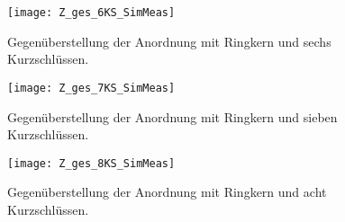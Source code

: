 \begin{figure}[htb]
	\centering
	\texttt{[image: Z\_ges\_6KS\_SimMeas]}
	\caption{Gegen\"uberstellung der Anordnung mit Ringkern und sechs Kurzschl\"ussen.}
	\label{fig:boxpolycrossrk6ksappend}
\end{figure}

\begin{figure}[htb]
	\centering
	\texttt{[image: Z\_ges\_7KS\_SimMeas]}
	\caption{Gegen\"uberstellung der Anordnung mit Ringkern und sieben Kurzschl\"ussen.}
	\label{fig:boxpolycrossrk7ksappend}
\end{figure}

\begin{figure}[htb]
	\centering
	\texttt{[image: Z\_ges\_8KS\_SimMeas]}
	\caption{Gegen\"uberstellung der Anordnung mit Ringkern und acht Kurzschl\"ussen.}
	\label{fig:boxpolycrossrk8ksappend}
\end{figure}